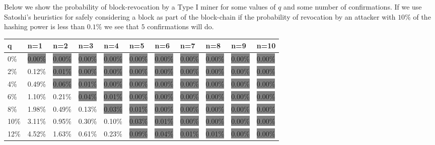 \documentclass[letterpaper,12pt]{report}
\begin{document}
Below we show the probability of block-revocation by a Type I miner for some values of $q$ and some number of confirmations. If we use Satoshi's heuristics for safely considering a block as part of the block-chain if the probability of revocation by an attacker with $10\%$ of the hashing power is less than $0.1\%$ we see that $5$ confirmations will do. 

\begin{table}
\resizebox{18cm}{!} {
    \begin{tabular}{l|llllllllll}
    q  & n=1     & n=2     & n=3     & n=4     & n=5     & n=6     & n=7     & n=8     & n=9     & n=10    \\ \hline
    0\% & \colorbox{gray}{0.00\%}  & \colorbox{gray}{0.00\%}  & \colorbox{gray}{0.00\%}  & \colorbox{gray}{0.00\%}  & \colorbox{gray}{0.00\%}  & \colorbox{gray}{0.00\%}  & \colorbox{gray}{0.00\%}  & \colorbox{gray}{0.00\%}  & \colorbox{gray}{0.00\%}  & \colorbox{gray}{0.00\%}  \\
    2\% & 0.12\%  & \colorbox{gray}{0.01\%}  & \colorbox{gray}{0.00\%}  & \colorbox{gray}{0.00\%}  & \colorbox{gray}{0.00\%}  & \colorbox{gray}{0.00\%}  & \colorbox{gray}{0.00\%}  & \colorbox{gray}{0.00\%}  & \colorbox{gray}{0.00\%}  & \colorbox{gray}{0.00\%}  \\
    4\% & 0.49\%  & \colorbox{gray}{0.06\%}  & \colorbox{gray}{0.01\%}  & \colorbox{gray}{0.00\%}  & \colorbox{gray}{0.00\%}  & \colorbox{gray}{0.00\%}  & \colorbox{gray}{0.00\%}  & \colorbox{gray}{0.00\%}  & \colorbox{gray}{0.00\%}  & \colorbox{gray}{0.00\%}  \\
    6\% & 1.10\%  & 0.21\%  & \colorbox{gray}{0.04\%}  & \colorbox{gray}{0.01\%}  & \colorbox{gray}{0.00\%}  & \colorbox{gray}{0.00\%}  & \colorbox{gray}{0.00\%}  & \colorbox{gray}{0.00\%}  & \colorbox{gray}{0.00\%}  & \colorbox{gray}{0.00\%}  \\
    8\% & 1.98\%  & 0.49\%  & 0.13\%  & \colorbox{gray}{0.03\%}  & \colorbox{gray}{0.01\%}  & \colorbox{gray}{0.00\%}  & \colorbox{gray}{0.00\%}  & \colorbox{gray}{0.00\%}  & \colorbox{gray}{0.00\%}  & \colorbox{gray}{0.00\%}  \\
    10\% & 3.11\%  & 0.95\%  & 0.30\%  & 0.10\%  & \colorbox{gray}{0.03\%}  & \colorbox{gray}{0.01\%}  & \colorbox{gray}{0.00\%}  & \colorbox{gray}{0.00\%}  & \colorbox{gray}{0.00\%}  & \colorbox{gray}{0.00\%}  \\
    12\% & 4.52\%  & 1.63\%  & 0.61\%  & 0.23\%  & \colorbox{gray}{0.09\%}  & \colorbox{gray}{0.04\%}  & \colorbox{gray}{0.01\%}  & \colorbox{gray}{0.01\%}  & \colorbox{gray}{0.00\%}  & \colorbox{gray}{0.00\%}  \\

\end{tabular}}
\end{table}
\end{document}
